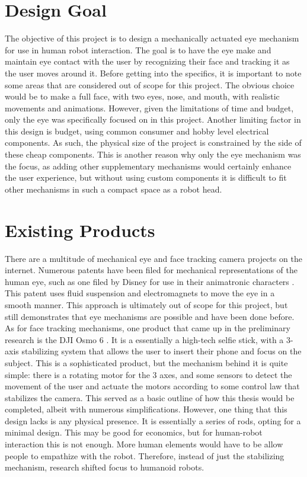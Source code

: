\section{Design Goal}
The objective of this project is to design a mechanically actuated eye mechanism for use in human robot interaction. The goal is to have the eye make and maintain eye contact with the user by recognizing their face and tracking it as the user moves around it. Before getting into the specifics, it is important to note some areas that are considered out of scope for this project. The obvious choice would be to make a full face, with two eyes, nose, and mouth, with realistic movements and animations. However, given the limitations of time and budget, only the eye was specifically focused on in this project. Another limiting factor in this design is budget, using common consumer and hobby level electrical components. As such, the physical size of the project is constrained by the side of these cheap components. This is another reason why only the eye mechanism was the focus, as adding other supplementary mechanisms would certainly enhance the user experience, but without using custom components it is difficult to fit other mechanisms in such a compact space as a robot head.

\section{Existing Products}
There are a multitude of mechanical eye and face tracking camera projects on the internet. Numerous patents have been filed for mechanical representations of the human eye, such as one filed by Disney for use in their animatronic characters \cite{smootAnimatronicEyeElectromagnetic2019}. This patent uses fluid suspension and electromagnets to move the eye in a smooth manner. This approach is ultimately out of scope for this project, but still demonstrates that eye mechanisms are possible and have been done before. As for face tracking mechanisms, one product that came up in the preliminary research is the DJI Osmo 6 \cite{djiOsmoMobileUnfold2022}. It is a essentially a high-tech selfie stick, with a 3-axis stabilizing system that allows the user to insert their phone and focus on the subject. This is a sophisticated product, but the mechanism behind it is quite simple: there is a rotating motor for the 3 axes, and some sensors to detect the movement of the user and actuate the motors according to some control law that stabilizes the camera. This served as a basic outline of how this thesis would be completed, albeit with numerous simplifications. However, one thing that this design lacks is any physical presence. It is essentially a series of rods, opting for a minimal design. This may be good for economics, but for human-robot interaction this is not enough. More human elements would have to be allow people to empathize with the robot. Therefore, instead of just the stabilizing mechanism, research shifted focus to humanoid robots.


